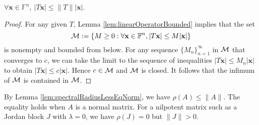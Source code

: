 \begin{coro}
  \label{coro:2normLessThanOpNorm}
  $\forall \mathbf{x}\in \mathbb{F}^n,\
  |T\mathbf{x}| \le \|T\||\mathbf{x}|$.
\end{coro}
\begin{proof}
  For any given $T$,
   Lemma \ref{lem:linearOperatorBounded} implies that
   the set
   \begin{displaymath}
     {\cal M}:=\left\{ M\ge 0 : \forall \mathbf{x}\in \mathbb{F}^n,
       |T\mathbf{x}| \le M |\mathbf{x}| \right\}
   \end{displaymath}
  is nonempty and bounded from below.
  For any sequence $\{M_n\}_{n=1}^{\infty}$ in ${\cal M}$
  that converges to $c$,
  we can take the limit to the sequence of inequalities
  $|T\mathbf{x}|\le M_n |\mathbf{x}|$
  to obtain $|T\mathbf{x}|\le c |\mathbf{x}|$.
  Hence $c\in {\cal M}$ and ${\cal M}$ is closed.
  It follows that the infimum of ${\cal M}$
  is contained in ${\cal M}$.
\end{proof}

\begin{rem}
  By Lemma \ref{lem:spectralRadiusLessEqNorm},
  we have $\rho(A)\le \|A\|$.
  The equality holds when $A$ is a normal matrix.
  For a nilpotent matrix such as a Jordan block $J$
  with $\lambda=0$,
  we have $\rho(J)=0$
  but $\|J\|>0$.
\end{rem}

